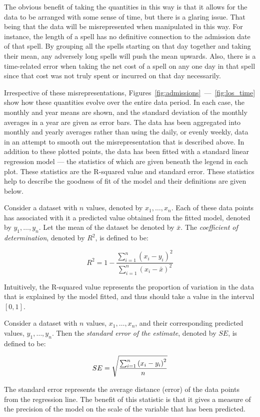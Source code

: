 The obvious benefit of taking the quantities in this way is that it allows for
the data to be arranged with some sense of time, but there is a glaring issue.
That being that the data will be misrepresented when manipulated in this way.
For instance, the length of a spell has no definitive connection to the
admission date of that spell. By grouping all the spells starting on that day
together and taking their mean, any adversely long spells will push the mean
upwards. Also, there is a time-related error when taking the net cost of a spell
on any one day in that spell since that cost was not truly spent or incurred on
that day necessarily.

Irrespective of these misrepresentations,
Figures~\ref{fig:admissions}~---~\ref{fig:los_time} show how these quantities
evolve over the entire data period. In each case, the monthly and year means are
shown, and the standard deviation of the monthly averages in a year are given as
error bars. The data has been aggregated into monthly and yearly averages rather
than using the daily, or evenly weekly, data in an attempt to smooth out the
misrepresentation that is described above. In addition to these plotted points,
the data has been fitted with a standard linear regression model --- the
statistics of which are given beneath the legend in each plot. These statistics
are the R-squared value and standard error. These statistics help to describe
the goodness of fit of the model and their definitions are given below.

\begin{definition}
    Consider a dataset with \(n\) values, denoted by \(x_1, \ldots, x_n\). Each
    of these data points has associated with it a predicted value obtained from
    the fitted model, denoted by \(y_1, \ldots, y_n\). Let the mean of the
    dataset be denoted by \(\bar x\). The \emph{coefficient of determination},
    denoted by \(R^2\), is defined to be:

    \[
        R^2 = 1 - \frac{\sum_{i=1}^{n} {\left(x_i - y_i\right)}^2}%
                       {\sum_{i=1}^{n} {\left(x_i - \bar x\right)}^2}
    \]

    Intuitively, the R-squared value represents the proportion of variation in
    the data that is explained by the model fitted, and thus should take a value
    in the interval \(\left[0, 1\right]\).
\end{definition}

\begin{definition}
    Consider a dataset with \(n\) values, \(x_1, \ldots, x_n\), and their
    corresponding predicted values, \(y_1, \ldots, y_n\). Then the
    \emph{standard error of the estimate}, denoted by \(SE\), is defined to be:

    \[
        SE = \sqrt{%
            \frac{\sum_{i=1}^{n} {\left(x_i - y_i\right)}^2}{n}
        }
    \]

    The standard error represents the average distance (error) of the data
    points from the regression line. The benefit of this statistic is that it
    gives a measure of the precision of the model on the scale of the variable
    that has been predicted.
\end{definition}

